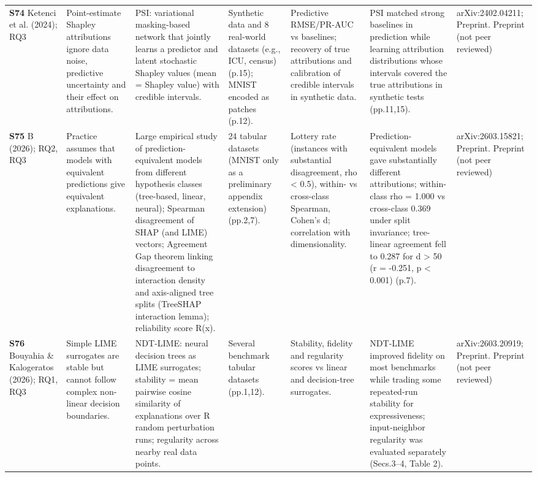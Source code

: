 \begin{longtable}{@{}P{1.55cm}P{2.9cm}P{4.5cm}P{3.2cm}P{3.4cm}P{4.6cm}P{3.6cm}@{}}
\textbf{S74} \cite{S74} Ketenci et al. (2024); RQ3 & Point-estimate Shapley attributions ignore data noise, predictive uncertainty and their effect on attributions. & PSI: variational masking-based network that jointly learns a predictor and latent stochastic Shapley values (mean = Shapley value) with credible intervals. & Synthetic data and 8 real-world datasets (e.g., ICU, census) (p.15); MNIST encoded as patches (p.12). & Predictive RMSE/\allowbreak{}PR-AUC vs baselines; recovery of true attributions and calibration of credible intervals in synthetic data. & PSI matched strong baselines in prediction while learning attribution distributions whose intervals covered the true attributions in synthetic tests (pp.11,15). & arXiv:2402.04211; Preprint. Preprint (not peer reviewed) \\
\textbf{S75} \cite{S75} B (2026); RQ2, RQ3 & Practice assumes that models with equivalent predictions give equivalent explanations. & Large empirical study of prediction-equivalent models from different hypothesis classes (tree-based, linear, neural); Spearman disagreement of SHAP (and LIME) vectors; Agreement Gap theorem linking disagreement to interaction density and axis-aligned tree splits (TreeSHAP interaction lemma); reliability score R(x). & 24 tabular datasets (MNIST only as a preliminary appendix extension) (pp.2,7). & Lottery rate (instances with substantial disagreement, rho \textless{} 0.5), within- vs cross-class Spearman, Cohen's d; correlation with dimensionality. & Prediction-equivalent models gave substantially different attributions; within-class rho = 1.000 vs cross-class 0.369 under split invariance; tree-linear agreement fell to 0.287 for d \textgreater{} 50 (r = -0.251, p \textless{} 0.001) (p.7). & arXiv:2603.15821; Preprint. Preprint (not peer reviewed) \\
\textbf{S76} \cite{S76} Bouyahia \& Kalogeratos (2026); RQ1, RQ3 & Simple LIME surrogates are stable but cannot follow complex non-linear decision boundaries. & NDT-LIME: neural decision trees as LIME surrogates; stability = mean pairwise cosine similarity of explanations over R random perturbation runs; regularity across nearby real data points. & Several benchmark tabular datasets (pp.1,12). & Stability, fidelity and regularity scores vs linear and decision-tree surrogates. & NDT-LIME improved fidelity on most benchmarks while trading some repeated-run stability for expressiveness; input-neighbor regularity was evaluated separately (Secs.3--4, Table 2). & arXiv:2603.20919; Preprint. Preprint (not peer reviewed) \\

\end{longtable}
